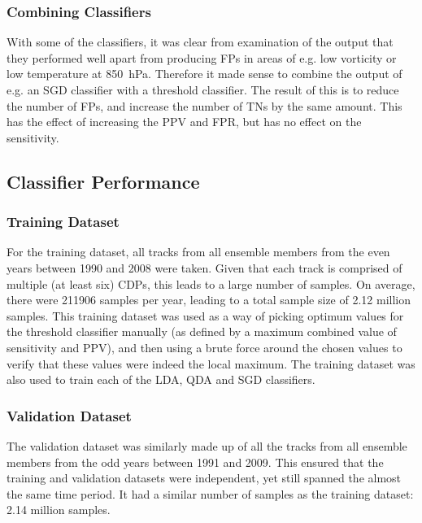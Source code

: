 \documentclass[pdftex,12pt,a4paper]{report}
\begin{document}
\subsubsection{Combining Classifiers}
With some of the classifiers, it was clear from examination of the output that they performed well
apart from producing FPs in areas of e.g. low vorticity or low temperature at \SI{850}{hPa}.
Therefore it made sense to combine the output of e.g. an SGD classifier with a threshold classifier.
The result of this is to reduce the number of FPs, and increase the number of TNs by the same
amount. This has the effect of increasing the PPV and FPR, but has no effect on the sensitivity.

\subsection{Classifier Performance}


\subsubsection{Training Dataset}
\label{sec:training_dataset}
For the training dataset, all tracks from all ensemble members from the even years between 1990 and
2008 were taken. Given that each track is comprised of multiple (at least six) CDPs, this leads to a
large number of samples. On average, there were \SI{211906}{} samples per year, leading to a total
sample size of 2.12 million samples. This training dataset was used as a way of picking optimum
values for the threshold classifier manually (as defined by a maximum combined value of sensitivity
and PPV), and then using a brute force around the chosen values to verify that these values were
indeed the local maximum. The training dataset was also used to train each of the LDA, QDA and SGD
classifiers.

\subsubsection{Validation Dataset} 
The validation dataset was similarly made up of all the tracks from all ensemble members from the
odd years between 1991 and 2009. This ensured that the training and validation datasets were
independent, yet still spanned the almost the same time period. It had a similar number of samples
as the training dataset: 2.14 million samples.
\end{document}
